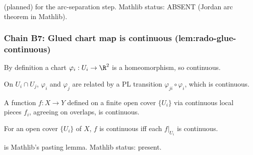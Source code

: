 \begin{lemma}
\label{lem:ret-r5}
 (planned) for the arc-separation step.  Mathlib status: ABSENT (Jordan arc theorem in Mathlib).
\leanok
\end{lemma}

\subsubsection*{Chain B7: Glued chart map is continuous (lem:rado-glue-continuous)}

\begin{lemma}
\label{lem:rgc-r1}
By definition a chart $\varphi_{i} : U_{i} \to \R^{2}$ is a homeomorphism, so continuous.
\leanok\mathlibok
\end{lemma}

\begin{lemma}
\label{lem:rgc-r2}
On $U_{i}\cap U_{j}$, $\varphi_{i}$ and $\varphi_{j}$ are related by a PL transition $\varphi_{ji}\circ\varphi_{i}$, which is continuous.
\leanok
\end{lemma}

\begin{lemma}
\label{lem:rgc-r3}
A function $f : X \to Y$ defined on a finite open cover $\{U_{i}\}$ via continuous local pieces $f_{i}$, agreeing on overlaps, is continuous.
\leanok\mathlibok
\end{lemma}

\begin{lemma}
\label{lem:rgc-r4}
For an open cover $\{U_{i}\}$ of $X$, $f$ is continuous iff each $f|_{U_{i}}$ is continuous.
\leanok\mathlibok
\end{lemma}

\begin{lemma}
\label{lem:rgc-r5}
 is Mathlib's pasting lemma.  Mathlib status: present.
\leanok\mathlibok
\end{lemma}


